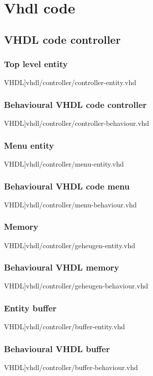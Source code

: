 \chapter[VHDL code]{Vhdl code}
\label{Ap:code_controller}
\section{VHDL code controller}
\subsection{Top level entity}
\scriptsize 
  VHDL]{vhdl/controller/controller-entity.vhd}
 \normalsize
\label{code:controller_ent}
\subsection{Behavioural VHDL code controller}
\scriptsize 
  VHDL]{vhdl/controller/controller-behaviour.vhd}
 \normalsize
\label{code:controller_beh}
\subsection{Menu entity}
\scriptsize 
  VHDL]{vhdl/controller/menu-entity.vhd}
 \normalsize
\label{code:menu_ent}
\subsection{Behavioural VHDL code menu}
\scriptsize 
  VHDL]{vhdl/controller/menu-behaviour.vhd}
 \normalsize
\label{code:menu_beh}
\subsection{Memory}
\scriptsize 
  VHDL]{vhdl/controller/geheugen-entity.vhd}
 \normalsize
\label{code:geheugen_ent}
\subsection{Behavioural VHDL memory}
\scriptsize 
  VHDL]{vhdl/controller/geheugen-behaviour.vhd}
 \normalsize
\label{code:geheugen_beh}
\subsection{Entity buffer}
\scriptsize 
  VHDL]{vhdl/controller/buffer-entity.vhd}
 \normalsize
\label{code:buffer_ent}
\subsection{Behavioural VHDL buffer}
\scriptsize 
  VHDL]{vhdl/controller/buffer-behaviour.vhd}
 \normalsize
\label{code:buffer_beh}
